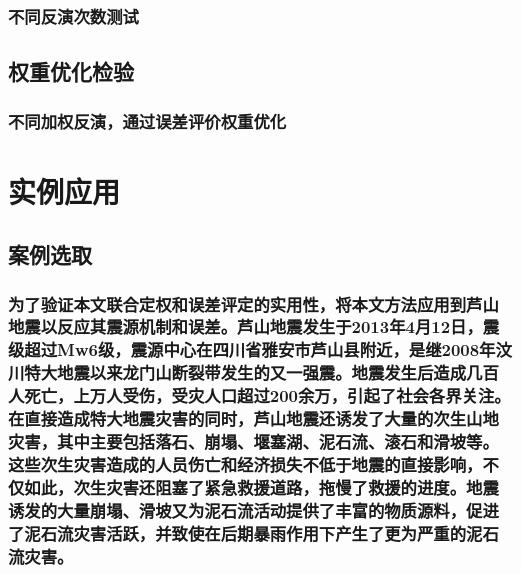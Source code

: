 \documentclass[a4paper,12pt,single,pdftex]{scrartcl}
\begin{document}
\label{ID_74589139}\subsubsection{不同反演次数测试}

\label{ID_1184261481}\paragraph{}

\label{ID_833255484}\paragraph{}

\label{ID_1985324973}\paragraph{}

\label{ID_849140981}\subsection{权重优化检验}

\label{ID_979847281}\subsubsection{不同加权反演，通过误差评价权重优化}

\label{ID_89289087}\section{实例应用}

\label{ID_1189436416}\subsection{案例选取}

\label{ID_887518159}\subsubsection{为了验证本文联合定权和误差评定的实用性，将本文方法应用到芦山地震以反应其震源机制和误差。芦山地震发生于2013年4月12日，震级超过Mw6级，震源中心在四川省雅安市芦山县附近，是继2008年汶川特大地震以来龙门山断裂带发生的又一强震。地震发生后造成几百人死亡，上万人受伤，受灾人口超过200余万\citep{崔鹏2013}，引起了社会各界关注。在直接造成特大地震灾害的同时，芦山地震还诱发了大量的次生山地灾害，其中主要包括落石、崩塌、堰塞湖、泥石流、滚石和滑坡等\citep{陈晓清2013}。这些次生灾害造成的人员伤亡和经济损失不低于地震的直接影响，不仅如此，次生灾害还阻塞了紧急救援道路，拖慢了救援的进度。地震诱发的大量崩塌、滑坡又为泥石流活动提供了丰富的物质源料，促进了泥石流灾害活跃，并致使在后期暴雨作用下产生了更为严重的泥石流灾害。}
\end{document}
